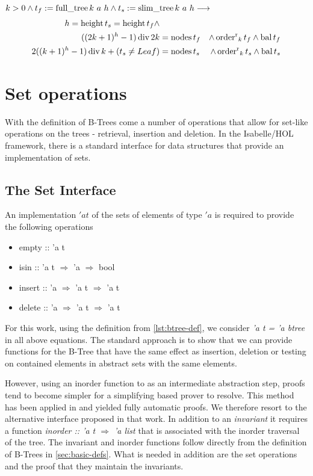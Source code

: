 \begin{theorem}
    $k > 0 \wedge t_f := \operatorname{full\_tree} k\ a\ h \wedge t_s := \operatorname{slim\_tree} k\ a\ h \longrightarrow$
    \begin{align}
    h = \operatorname{height} t_s = \operatorname{height} t_f \wedge \\
        ((2k+1)^h - 1) \operatorname{div} 2k &= \operatorname{nodes} t_f &\wedge \operatorname{order^r}_k t_f \wedge \operatorname{bal} t_f \\ 
        2((k+1)^h - 1) \operatorname{div} k + (t_s \neq Leaf) &= \operatorname{nodes} t_s &\wedge \operatorname{order^r}_k t_s \wedge \operatorname{bal} t_s
    \end{align}
\end{theorem}


\section{Set operations}

With the definition of B-Trees come a number of operations that allow for set-like operations
on the trees - retrieval, insertion and deletion.
In the Isabelle/HOL framework, there is a standard interface
for data structures that provide an implementation of sets.

\subsection{The Set Interface}

An implementation $'a t$ of the sets of elements of type $'a$ is required to provide the following
operations

\begin{itemize}
    \itshape
    \item empty :: 'a t
    \item isin :: 'a t $\Rightarrow$ 'a $\Rightarrow$ bool
    \item insert :: 'a $\Rightarrow$ 'a t $\Rightarrow$ 'a t
    \item delete :: 'a $\Rightarrow$ 'a t $\Rightarrow$ 'a t
\end{itemize}

For this work, using the definition from \autoref{lst:btree-def},
we consider \textit{'a t = 'a btree} in all above equations.
The standard approach is to show that we can provide functions for the B-Tree
that have the same effect as insertion, deletion or testing on contained elements
in abstract sets with the same elements.

However, using an inorder function to
as an intermediate abstraction step, proofs tend to become simpler for a simplifying
based prover to resolve. 
This method has been applied in \parencite{DBLP:conf/itp/Nipkow16} and yielded
fully automatic proofs.
We therefore resort to the alternative interface proposed in that work.
In addition to an \textit{invariant}
it requires a function \textit{inorder :: 'a t $\Rightarrow$ 'a list}
that is associated with the inorder traversal of the tree.
The invariant and inorder functions follow directly from the
definition of B-Trees in \autoref{sec:basic-defs}.
What is needed in addition are the set operations
and the proof that they maintain the invariants.

